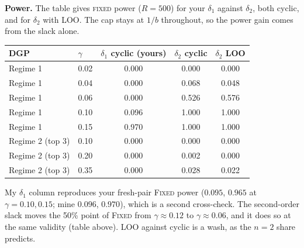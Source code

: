 \documentclass[11pt]{article}
\begin{document}
\textbf{Power.} The table gives \textsc{fixed} power ($R=500$) for your $\delta_1$ against $\delta_2$, both cyclic, and for $\delta_2$ with LOO. The cap stays at $1/b$ throughout, so the power gain comes from the slack alone.
\begin{center}\small
\begin{tabular}{llccc}
\toprule
DGP & $\gamma$ & $\delta_1$ cyclic (yours) & $\delta_2$ cyclic & $\delta_2$ LOO\\
\midrule
Regime 1 & 0.02 & 0.000 & 0.000 & 0.000\\
Regime 1 & 0.04 & 0.000 & 0.068 & 0.048\\
Regime 1 & 0.06 & 0.000 & 0.526 & 0.576\\
Regime 1 & 0.10 & 0.096 & 1.000 & 1.000\\
Regime 1 & 0.15 & 0.970 & 1.000 & 1.000\\
Regime 2 (top 3) & 0.10 & 0.000 & 0.000 & 0.000\\
Regime 2 (top 3) & 0.20 & 0.000 & 0.002 & 0.000\\
Regime 2 (top 3) & 0.35 & 0.000 & 0.028 & 0.022\\
\bottomrule
\end{tabular}
\end{center}
My $\delta_1$ column reproduces your fresh-pair \textsc{Fixed} power ($0.095$, $0.965$ at $\gamma=0.10,0.15$; mine $0.096$, $0.970$), which is a second cross-check. The second-order slack moves the 50\% point of \textsc{Fixed} from $\gamma\approx0.12$ to $\gamma\approx0.06$, and it does so at the same validity (table above). LOO against cyclic is a wash, as the $n=2$ share predicts.
\end{document}
